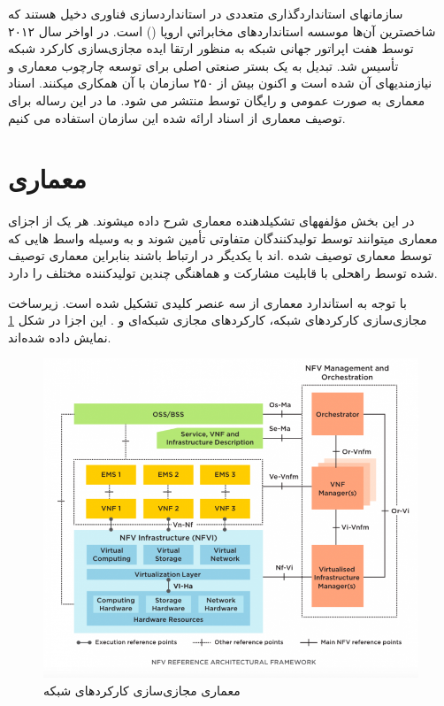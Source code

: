 سازمان‍های استانداردگذاری متعددی در استانداردسازی فناوری  دخیل هستند که شاخص‍ترین آن‌ها موسسه استانداردهای مخابراتي اروپا () است.
در اواخر سال ۲۰۱۲
توسط هفت اپراتور جهانی شبکه به منظور ارتقا ایده مجازی‌‍سازی کارکرد شبکه تأسیس شد.
تبدیل به یک بستر صنعتی اصلی برای توسعه چارچوب معماری  و نیازمندی‍های آن شده است و اکنون بیش از ۲۵۰ سازمان با آن همکاری میکنند.
اسناد معماری  به صورت عمومی و رایگان توسط  منتشر می شود.
ما در این رساله برای توصیف معماری  از اسناد ارائه شده این سازمان استفاده می کنیم.

\section{معماری }

در این بخش مؤلفه‍های تشکیل‍دهنده معماری  شرح داده می‍شوند.
هر یک از اجزای معماری می‍توانند توسط تولیدکنندگان متفاوتی تأمین شوند و به وسیله واسط هایی که توسط معماری  توصیف شده 
.اند با یکدیگر در ارتباط باشند
 بنابراین معماری  توصیف شده توسط  راه‍حلی با قابلیت مشارکت و هماهنگی چندین تولیدکننده مختلف را دارد.

با توجه به استاندارد  معماری 
از سه عنصر کلیدی تشکیل شده است.
زیرساخت مجازی‌سازی کارکردهای شبکه،
کارکردهای مجازی شبکه‌ای و
.
این اجزا در شکل \cref{fig.1} نمایش داده شده‌اند.

\begin{figure}[!h]
\center\includegraphics[scale=.5]{images/nfv-arch}
\caption{معماری مجازی‌سازی کارکردهای شبکه
}\label{fig.1}
\end{figure}

